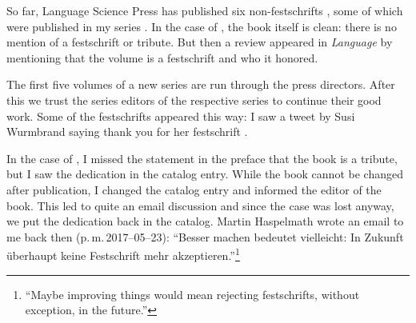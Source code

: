 \documentclass[output=paper,colorlinks,citecolor=brown]{langscibook}
\begin{document}
So far, Language Science Press has published six non-festschrifts
\citep{BS2017a-ed,BBDV2020a-ed,LS2021a-ed,MS2022a-ed,BHZ2017a-ed,BBDGN2018a-ed}, some of which were published
in my series \citep{BHZ2017a-ed,BBDGN2018a-ed}.
%
% 
% 
% 
%
%
%
%
%
In the case of \citet{BBDGN2018a-ed}, the book itself is clean: there is no mention of a festschrift or
tribute. But then a review appeared in \emph{Language} by \citet{Bauer2020a-u} mentioning that the
volume is a festschrift and who it honored. 

The first five volumes of a new series are run through the press directors. After this we trust the
series editors of the respective series to continue their good work. Some of the festschrifts appeared
this way: I saw a tweet by Susi Wurmbrand saying thank you for her festschrift \citep{LS2021a-ed}.


In the case of \citet{BHZ2017a-ed}, I missed the statement in the preface that the book is a tribute,
but I saw the dedication in the catalog entry. While the book cannot be changed after publication, I
changed the catalog entry and informed the editor of the book. This led to quite an email
discussion and since the case was lost anyway, we put the dedication back in the catalog. 
Martin Haspelmath wrote an email to me back then
(p.\,m.\,2017--05--23): ``Besser machen bedeutet viel\-leicht: In Zukunft überhaupt keine Festschrift mehr
akzeptieren.''\footnote{
%
%
``Maybe improving things would mean rejecting festschrifts, without exception, in the future.''
}
\end{document}
